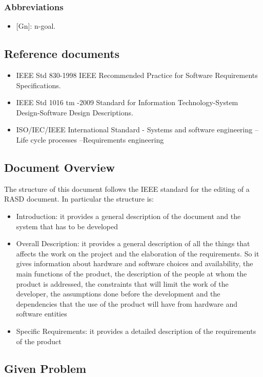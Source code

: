 \documentclass[english]{article}
\newcounter{requirement}
\begin{document}
\subsubsection{Abbreviations}
\begin{itemize}
	\item {[}Gn{]}: n-goal.
\end{itemize}


\subsection{Reference documents}
\begin{itemize}
	\item IEEE Std 830-1998 IEEE Recommended Practice for Software Requirements Specifications.
	\item IEEE Std 1016 tm -2009 Standard for Information Technology-System Design-Software Design Descriptions.
	\item ISO/IEC/IEEE International Standard - Systems and software engineering -- Life cycle processes --Requirements engineering
\end{itemize}

\subsection{Document Overview}
The structure of this document follows the IEEE standard for the editing of a RASD document. In particular the structure is:

\begin{itemize}
	\item Introduction: it provides a general description of the document and the system that has to be developed
	\item Overall Description: it provides a general description of all the things that  affects the work on the project and the elaboration of the requirements. So it gives information about hardware and software choices and availability, the main functions of the product, the description of the people at whom the product is addressed, the constraints that will limit the work of the developer, the assumptions done before the development and the dependencies that the use of the product will have from hardware and software entities
	\item Specific Requirements: it provides a detailed description of the requirements of the product
\end{itemize}


\subsection{Given Problem}
\end{document}
